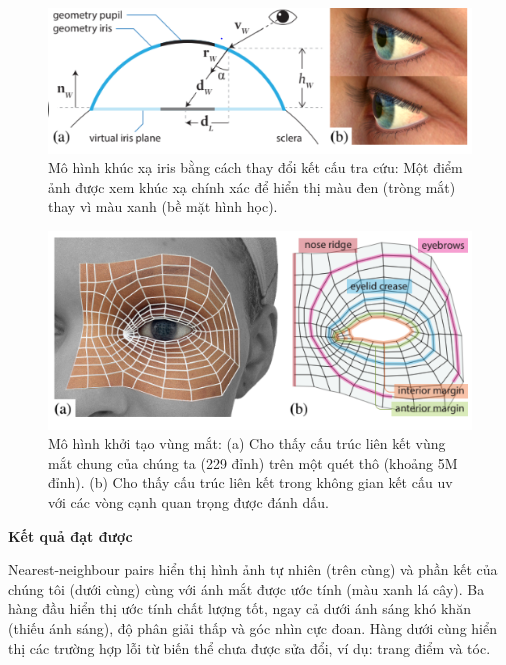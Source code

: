 \begin{center}
    \begin{figure}[h!]
    \begin{center}
     \includegraphics[scale=1]{img/Model_iris_refraction.png}
    \end{center}
    \caption{Mô hình khúc xạ iris bằng cách thay đổi kết cấu tra cứu: Một điểm ảnh được xem khúc xạ chính xác để hiển thị màu đen (tròng mắt) thay vì màu xanh (bề mặt hình học).}
    \label{refhinh15}
    \end{figure}
\end{center}

\begin{center}
    \begin{figure}[h!]
    \begin{center}
     \includegraphics[scale=1]{img/Generative_eye_region_model.PNG}
    \end{center}
    \caption{Mô hình khởi tạo vùng mắt: (a) Cho thấy cấu trúc liên kết vùng mắt chung của chúng ta (229 đỉnh) trên một quét thô (khoảng 5M đỉnh). (b) Cho thấy cấu trúc liên kết trong không gian kết cấu uv với các vòng cạnh quan trọng được đánh dấu.}
    \label{refhinh15}
    \end{figure}
\end{center}

\textbf{Kết quả đạt được}

Nearest-neighbour pairs hiển thị hình ảnh tự nhiên (trên cùng) và phần kết của chúng tôi (dưới cùng) cùng với ánh mắt được ước tính (màu xanh lá cây).
Ba hàng đầu hiển thị ước tính chất lượng tốt, ngay cả dưới ánh sáng khó khăn (thiếu ánh sáng), độ phân giải thấp và góc nhìn cực đoan.
Hàng dưới cùng hiển thị các trường hợp lỗi từ biến thể chưa được sửa đổi, ví dụ: trang điểm và tóc.

